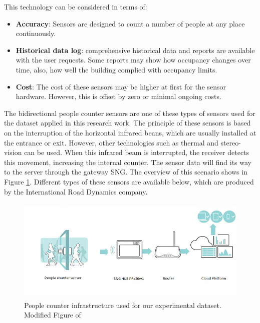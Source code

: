 This technology can be considered in terms of:
\begin{itemize}
    \item\textbf{Accuracy}: Sensors are designed to count a number of people at any place continuously.
    \item\textbf{Historical data log}: comprehensive historical data and reports are available with the user requests. Some reports may show how occupancy changes over time, also, how well the building complied with occupancy limits.
    \item\textbf{Cost}: The cost of these sensors may be higher at first for the sensor hardware. However, this is offset by zero or minimal ongoing costs.
\end{itemize}

The bidirectional people counter sensors are one of these types of sensors used for the dataset applied in this research work. The principle of these sensors is based on the interruption of the horizontal infrared beans, which are usually installed at the entrance or exit. However, other technologies such as thermal and stereo-vision can be used. When this infrared beam is interrupted, the receiver detects this movement, increasing the internal counter. The sensor data will find its way to the server through the gateway SNG. The overview of this scenario shows in Figure \ref{people}. Different types of these sensors are available below, which are produced by the International Road Dynamics company.

\begin{figure}
\centering
\includegraphics[width = 12cm,height = 5cm]{image/pc.jpg}
\caption{People counter infrastructure used for our experimental dataset. Modified Figure of \protect\cite{SensM}}
\label{people}
\end{figure}



